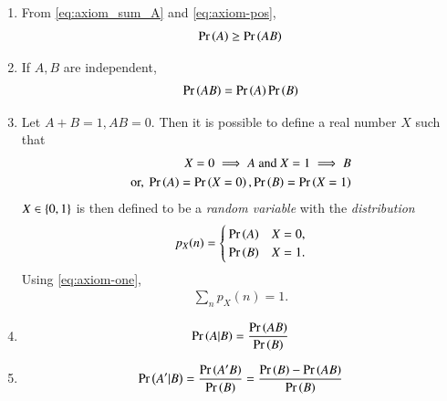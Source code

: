 \begin{enumerate}[label=\thesubsection.\arabic*,ref=\thesubsection.\theenumi]
\begin{proof}
\begin{align}
\label{eq:axiom_sum_ApB}
\end{align}
From 
\eqref{eq:axiom_sum_A}
and 
\eqref{eq:axiom_sum_ApB},
we obtain
\eqref{eq:axiom_sum_AB}.
		\end{proof}
	\item 
From \eqref{eq:axiom_sum_A}
and 
	\eqref{eq:axiom-pos},
\begin{align}
	\label{eq:axiom-prod-ge}
	\pr{A} \ge \pr{AB}
\end{align}
\item If $A, B$ are independent,
\begin{align}
	\pr{AB} = \pr{A}\pr{B}
\label{eq:axiom-ind}
\end{align}
\item Let $A + B = 1, AB = 0$.  Then it is possible to define a real number $X$ such that 
\begin{align}
	X = 0 \implies A \text{ and } X = 1 \implies B
	\\
	\text{or, }
	\Pr\left(A\right) = \Pr\left(X=0\right),
	\Pr\left(B\right) = \Pr\left(X=1\right)
\end{align}
$X \in \left\{0,1\right\}$ is then defined to be a {\em random variable} with the {\em distribution}
\begin{align}
	\label{eq:dist}
	p_X(n) = 
	\begin{cases}
		\pr{A} & X=0,
		\\
		\pr{B} & X=1.
\end{cases}
\end{align}
Using 
	\eqref{eq:axiom-one},
\begin{align}
	\sum_n p_X(n) = 1.
	\label{eq:dist-axiom-one}
\end{align}
\item 
\begin{align}
	\pr{A | B} = \frac{\pr{AB}}{\pr{B}}
\label{eq:axiom-cond}
\end{align}
\item 
\begin{align}
	\pr{A' | B} = \frac{\pr{A'B}}{\pr{B}} = \frac{\pr{B}-\pr{AB}}{\pr{B}}
\label{eq:axiom-cond-prime}
\end{align}
\end{enumerate}

